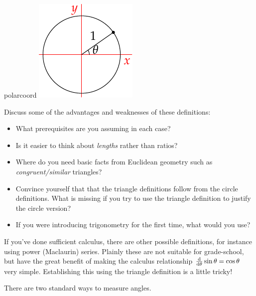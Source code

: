 \begin{defn}[lower separated=false, sidebyside, sidebyside align=top seam, sidebyside gap=0pt, righthand width=0.28\linewidth]{}{polarcoord}
\includegraphics{defn-trig3}\phantom{bobo}
\end{defn}

Discuss some of the advantages and weaknesses of these definitions:
\begin{itemize}
  \item What prerequisites are you assuming in each case?
  \item Is it easier to think about \emph{lengths} rather than ratios?
  \item Where do you need basic facts from Euclidean geometry such as \emph{congruent/similar} triangles?
  \item Convince yourself that that the triangle definitions follow from the circle definitions. What is missing if you try to use the triangle definition to justify the circle version?
  \item If you were introducing trigonometry for the first time, what would you use?
\end{itemize}
If you've done sufficient calculus, there are other possible definitions, for instance using power (Maclaurin) series. Plainly these are not suitable for grade-school, but have the great benefit of making the calculus relationship $\frac{\mathrm{d} }{\mathrm{d} \theta}\sin\theta=\cos\theta$ very simple. Establishing this using the triangle definition is a little tricky!



There are two standard ways to measure angles.

